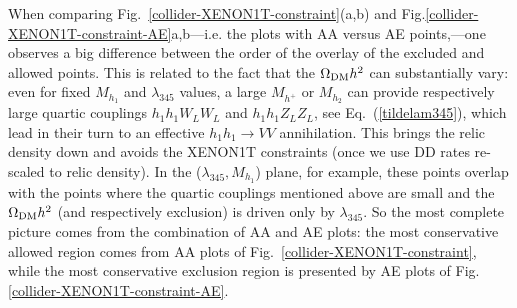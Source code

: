 \documentclass[12pt,a4paper]{article}
\begin{document}
When comparing Fig.~\ref{collider-XENON1T-constraint}(a,b) and 
Fig.\ref{collider-XENON1T-constraint-AE}a,b---i.e. the plots with AA versus AE points,---one observes
a big difference between the order of the overlay of the excluded and allowed points.
This is related to the fact that the $\Omega_{\rm DM} h^2$ can substantially vary:
even for  fixed $M_{h_1}$ and  $\lambda_{345}$ values,
a large $M_{h^+}$ or $M_{h_2}$  can provide respectively large quartic couplings $h_1 h_1 W_L W_L$ and  $h_1 h_1 Z_L Z_L$, see Eq.~(\ref{tildelam345}), 
which lead in their turn to an effective $h_1 h_1 \to VV$  annihilation. This brings the relic density down and 
avoids the XENON1T constraints (once we use DD rates re-scaled to relic density).
In the ($\lambda_{345},M_{h_1}$) plane, for example, these points overlap with the points 
where the quartic couplings mentioned above are small and the  $\Omega_{\rm DM} h^2$ (and respectively exclusion) is driven only by $\lambda_{345}$. 
So the most complete picture comes from the combination of AA and AE plots:
the most conservative allowed region comes from AA plots of Fig.~\ref{collider-XENON1T-constraint}, while the most conservative exclusion region
is presented by AE plots of Fig.\ref{collider-XENON1T-constraint-AE}.
\end{document}
